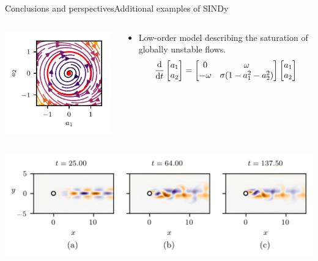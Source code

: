 \documentclass[usenames,dvipsnames,svgnames,10pt,aspectratio=169]{beamer}
\begin{document}
\begin{frame}[t, c]{Conclusions and perspectives}{Additional examples of SINDy}
	\centering

	\begin{columns}
		\begin{column}{.4\textwidth}
			\centering
			\includegraphics[width=.66\textwidth]{phase_plane_cylinder}
		\end{column}
		\begin{column}{.6\textwidth}
			\begin{itemize}
				\item Low-order model describing the saturation of globally unstable flows.
				\bigskip
				\begin{equation}
					\displaystyle \frac{\mathrm{d}}{\mathrm{d}t} \begin{bmatrix} a_1 \\ a_2 \end{bmatrix}
					=
					\begin{bmatrix}
						0 & \omega \\
						-\omega & \sigma(1 - a_1^2 - a_2^2)
					\end{bmatrix}
				 	\begin{bmatrix} a_1 \\ a_2 \end{bmatrix}
					\notag
				\end{equation}
			\end{itemize}
			\vspace{0.5cm}
		\end{column}
	\end{columns}

	\includegraphics[width=.8\textwidth]{figure_3}

	\vspace{1cm}
\end{frame}
\end{document}

